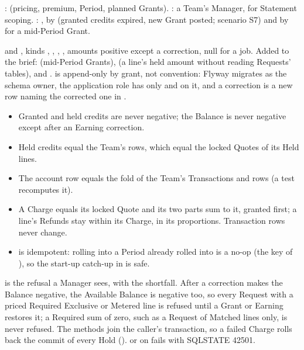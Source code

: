 :  (pricing, premium, Period, planned Grants). : a Team's Manager, for Statement scoping. : , by  (granted credits expired, new Grant posted; scenario S7) and by  for a mid-Period Grant.

 and , kinds , , , , amounts positive except a correction,  null for a job. Added to the brief:  (mid-Period Grants),  (a line's held amount without reading Requests' tables), and .  is append-only by grant, not convention: Flyway migrates as the schema owner, the application role has only  and  on it, and a correction is a new row naming the corrected one in .

\begin{itemize}
\item Granted and held credits are never negative; the Balance is never negative except after an Earning correction.
\item Held credits equal the Team's  rows, which equal the locked Quotes of its Held lines.
\item The account row equals the fold of the Team's Transactions and  rows (a test recomputes it).
\item A Charge equals its locked Quote and its two parts sum to it, granted first; a line's Refunds stay within its Charge, in its proportions. Transaction rows never change.
\item {} is idempotent: rolling into a Period already rolled into is a no-op (the key of ), so the start-up catch-up in  is safe.
\end{itemize}

 is the refusal a Manager sees, with the shortfall. After a correction makes the Balance negative, the Available Balance is negative too, so every Request with a priced Required Exclusive or Metered line is refused until a Grant or Earning restores it; a Required sum of zero, such as a Request of Matched lines only, is never refused. The methods join the caller's transaction, so a failed Charge rolls back the commit of every Hold ().  or  on  fails with SQLSTATE 42501.

